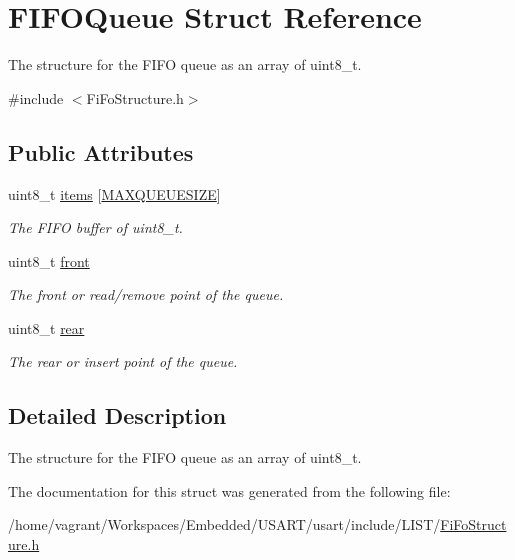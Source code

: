 \hypertarget{struct_f_i_f_o_queue}{\section{F\+I\+F\+O\+Queue Struct Reference}
\label{struct_f_i_f_o_queue}
}


The structure for the F\+I\+F\+O queue as an array of uint8\+\_\+t.  




{\ttfamily \#include $<$Fi\+Fo\+Structure.\+h$>$}

\subsection*{Public Attributes}
\begin{DoxyCompactItemize}
\item 
\hypertarget{struct_f_i_f_o_queue_ad832dabeb006127f9dcf7d4693613fc7}{uint8\+\_\+t \hyperlink{struct_f_i_f_o_queue_ad832dabeb006127f9dcf7d4693613fc7}{items} \mbox{[}\hyperlink{_fi_fo_structure_8h_a8064615b9f07036146ddba2d78ab43ac}{M\+A\+X\+Q\+U\+E\+U\+E\+S\+I\+Z\+E}\mbox{]}}\label{struct_f_i_f_o_queue_ad832dabeb006127f9dcf7d4693613fc7}

\begin{DoxyCompactList}\small\item\em The F\+I\+F\+O buffer of uint8\+\_\+t. \end{DoxyCompactList}\item 
\hypertarget{struct_f_i_f_o_queue_ab393c0ab68e6f4f1e7ca80e05f4a4b47}{uint8\+\_\+t \hyperlink{struct_f_i_f_o_queue_ab393c0ab68e6f4f1e7ca80e05f4a4b47}{front}}\label{struct_f_i_f_o_queue_ab393c0ab68e6f4f1e7ca80e05f4a4b47}

\begin{DoxyCompactList}\small\item\em The front or read/remove point of the queue. \end{DoxyCompactList}\item 
\hypertarget{struct_f_i_f_o_queue_aac24c5ae1ca7d4dfc05df6e0c4e54db5}{uint8\+\_\+t \hyperlink{struct_f_i_f_o_queue_aac24c5ae1ca7d4dfc05df6e0c4e54db5}{rear}}\label{struct_f_i_f_o_queue_aac24c5ae1ca7d4dfc05df6e0c4e54db5}

\begin{DoxyCompactList}\small\item\em The rear or insert point of the queue. \end{DoxyCompactList}\end{DoxyCompactItemize}


\subsection{Detailed Description}
The structure for the F\+I\+F\+O queue as an array of uint8\+\_\+t. 

The documentation for this struct was generated from the following file\+:\begin{DoxyCompactItemize}
\item 
/home/vagrant/\+Workspaces/\+Embedded/\+U\+S\+A\+R\+T/usart/include/\+L\+I\+S\+T/\hyperlink{_fi_fo_structure_8h}{Fi\+Fo\+Structure.\+h}\end{DoxyCompactItemize}
